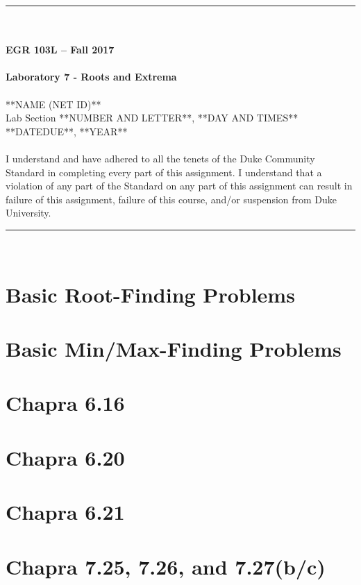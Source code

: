 \documentclass{article}
\begin{document}
\begin{center}
\rule{6.5in}{0.5mm}\\~\\
\textbf{\large EGR 103L -- Fall 2017}\\~\\
\textbf{\huge Laboratory 7 - Roots and Extrema}\\~\\
**NAME (NET ID)**\\
Lab Section **NUMBER AND LETTER**, **DAY AND TIMES**\\
**DATEDUE**, **YEAR**\\~\\
{\small I understand and have adhered to all the tenets of the Duke
  Community Standard in completing every part of this assignment.  I
  understand that a violation of any part of the Standard on any part
  of this assignment can result in failure of this assignment, failure
  of this course, and/or suspension from Duke University.} 
\rule{6.5in}{0.5mm}\\
\end{center}
\tableofcontents
\listoffigures
\pagebreak

\section{Basic Root-Finding Problems}

\section{Basic Min/Max-Finding Problems}
 
\section{Chapra 6.16}

\section{Chapra 6.20}

\section{Chapra 6.21}

\section{Chapra 7.25, 7.26, and 7.27(b/c)}
\end{document}

